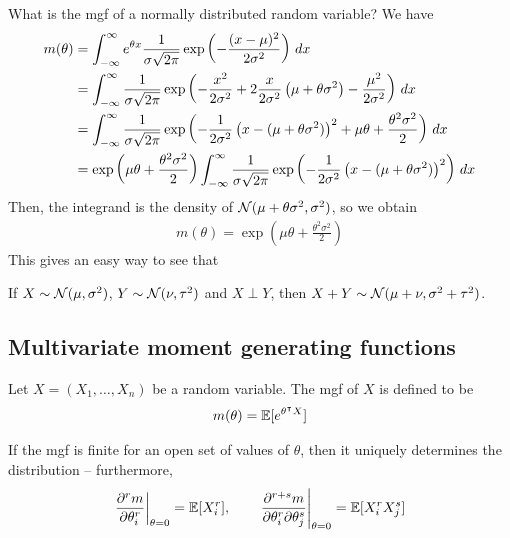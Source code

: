 \documentclass{../../template/note}
\begin{document}
    What is the mgf of a normally distributed random variable? We have
    \begin{align*}
        m(\theta) &= \int_{-\infty}^\infty e^{\theta x} \frac{1}{\sigma \sqrt{2\pi}} \exp\left(-\frac{(x-\mu)^2}{2\sigma^2}\right) \,d{x} \\
        &= \int_{-\infty}^\infty \frac{1}{\sigma \sqrt{2\pi}} \exp\left(-\frac{x^2}{2\sigma^2}+2\frac{x}{2\sigma^2}\left(\mu+\theta\sigma^2\right)-\frac{\mu^2}{2\sigma^2}\right) \,d{x} \\
        &= \int_{-\infty}^\infty \frac{1}{\sigma \sqrt{2\pi}} \exp\left(-\frac 1{2\sigma^2}\left(x-(\mu+\theta\sigma^2)\right)^2+\mu\theta+\frac{\theta^2\sigma^2}2\right) \,d{x} \\
        &= \exp\left(\mu\theta + \frac{\theta^2\sigma^2}2\right) \int_{-\infty}^\infty \frac{1}{\sigma \sqrt{2\pi}} \exp\left(-\frac 1{2\sigma^2}\left(x-(\mu+\theta\sigma^2)\right)^2\right) \,d{x}
    \end{align*}
    Then, the integrand is the density of \(\mathcal{N}(\mu+\theta\sigma^2, \sigma^2)\), so we obtain
    \begin{align*}
        m(\theta) = \exp\left(\mu\theta + \frac{\theta^2\sigma^2}{2}\right)
    \end{align*}
    This gives an easy way to see that
    \begin{proposition}
        If \(X \sim \mathcal{N}(\mu, \sigma^2)\), \(Y \sim \mathcal{N}(\nu, \tau^2)\) and \(X \perp Y\), then \(X + Y \sim \mathcal{N}(\mu+\nu, \sigma^2+\tau^2)\).
    \end{proposition}
    
    \subsection{Multivariate moment generating functions}

    \begin{definition}
        Let \(X = (X_1, \dots, X_n)\) be a random variable. The mgf of \( X\) is defined to be
        \begin{align*}
            m( \theta) = \mathbb E[e^{ \theta^\intercal  X}]
        \end{align*}
    \end{definition}
    
    \begin{theorem}
        If the mgf is finite for an open set of values of \( \theta\), then it uniquely determines the distribution -- furthermore,
        \begin{align*}
            \pd[\theta=0]{^r m}{\theta_i^r} = \EE[X_i^r], \qquad \pd[\theta=0]{^{r+s}m}{\theta_i^r \pr \theta_j^s} = \EE[X_i^r X_j^s]
        \end{align*}
    \end{theorem}
    
\end{document}
